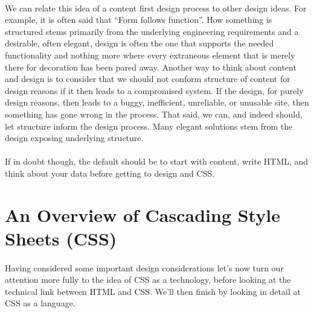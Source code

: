 \paragraph{} We can relate this idea of a content first design process to other design ideas. For example, it is often said that ``Form follows function''. How something is structured stems primarily from the underlying engineering requirements and a desirable, often elegant, design is often the one that supports the needed functionality and nothing more where every extraneous element that is merely there for decoration has been pared away. Another way to think about content and design is 
to consider that we should not conform structure of content for design reasons if it then leads to a compromised system. If the design, for purely design reasons, then leads to a buggy, inefficient, unreliable, or unusable site, then something has gone wrong in the process. That said, we can, and indeed should, let structure inform the design process. Many elegant solutions stem from the design exposing underlying structure.
\paragraph{} If in doubt though, the default should be to start with content, write HTML, and think about your data before getting to design and CSS.



\section{An Overview of Cascading Style Sheets (CSS)}
\paragraph{} Having considered some important design considerations let’s now turn our attention more fully to the idea of CSS as a technology, before looking at the technical link between HTML and CSS. We'll then finish by looking in detail at CSS as a language.
